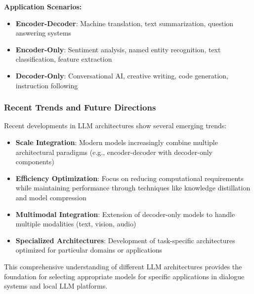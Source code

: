 \documentclass[12pt,a4paper]{article}
\begin{document}
\textbf{Application Scenarios:}

\begin{itemize}
    \item \textbf{Encoder-Decoder}: Machine translation, text summarization, question answering systems
    \item \textbf{Encoder-Only}: Sentiment analysis, named entity recognition, text classification, feature extraction
    \item \textbf{Decoder-Only}: Conversational AI, creative writing, code generation, instruction following
\end{itemize}

\subsubsection{Recent Trends and Future Directions}

Recent developments in LLM architectures show several emerging trends:

\begin{itemize}
    \item \textbf{Scale Integration}: Modern models increasingly combine multiple architectural paradigms (e.g., encoder-decoder with decoder-only components)
    \item \textbf{Efficiency Optimization}: Focus on reducing computational requirements while maintaining performance through techniques like knowledge distillation and model compression
    \item \textbf{Multimodal Integration}: Extension of decoder-only models to handle multiple modalities (text, vision, audio)
    \item \textbf{Specialized Architectures}: Development of task-specific architectures optimized for particular domains or applications
\end{itemize}

This comprehensive understanding of different LLM architectures provides the foundation for selecting appropriate models for specific applications in dialogue systems and local LLM platforms.
\end{document}

